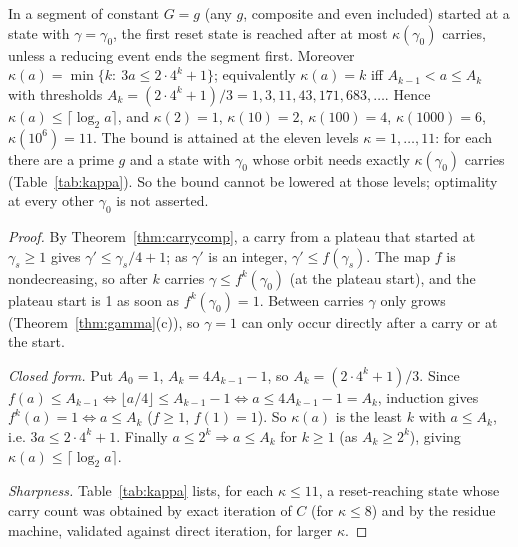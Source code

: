 \begin{theorem}\label{thm:kappa}
In a segment of constant \(G=g\) (any \(g\), composite and even included) started at a state with \(\gamma=\gamma_0\), the first reset state is reached after at most \(\kappa(\gamma_0)\) carries, unless a reducing event ends the segment first. Moreover \(\kappa(a)=\min\{k:\ 3a\le2\cdot4^k+1\}\); equivalently \(\kappa(a)=k\) iff \(A_{k-1}<a\le A_k\) with thresholds \(A_k=(2\cdot4^k+1)/3=1,3,11,43,171,683,\dots\). Hence \(\kappa(a)\le\lceil\log_2a\rceil\), and \(\kappa(2)=1\), \(\kappa(10)=2\), \(\kappa(100)=4\), \(\kappa(1000)=6\), \(\kappa(10^6)=11\). The bound is attained at the eleven levels \(\kappa=1,\dots,11\): for each there are a prime \(g\) and a state with \(\gamma_0\) whose orbit needs exactly \(\kappa(\gamma_0)\) carries (Table~\ref{tab:kappa}). So the bound cannot be lowered at those levels; optimality at every other \(\gamma_0\) is not asserted.
\end{theorem}
\begin{proof}
By Theorem~\ref{thm:carrycomp}, a carry from a plateau that started at \(\gamma_s\ge1\) gives \(\gamma'\le\gamma_s/4+1\); as \(\gamma'\) is an integer, \(\gamma'\le f(\gamma_s)\). The map \(f\) is nondecreasing, so after \(k\) carries \(\gamma\le f^k(\gamma_0)\) (at the plateau start), and the plateau start is 1 as soon as \(f^k(\gamma_0)=1\). Between carries \(\gamma\) only grows (Theorem~\ref{thm:gamma}(c)), so \(\gamma=1\) can only occur directly after a carry or at the start.

\emph{Closed form.} Put \(A_0=1\), \(A_k=4A_{k-1}-1\), so \(A_k=(2\cdot4^k+1)/3\). Since \(f(a)\le A_{k-1}\iff\lfloor a/4\rfloor\le A_{k-1}-1\iff a\le4A_{k-1}-1=A_k\), induction gives \(f^k(a)=1\iff a\le A_k\) (\(f\ge1\), \(f(1)=1\)). So \(\kappa(a)\) is the least \(k\) with \(a\le A_k\), i.e. \(3a\le2\cdot4^k+1\). Finally \(a\le2^k\Rightarrow a\le A_k\) for \(k\ge1\) (as \(A_k\ge2^k\)), giving \(\kappa(a)\le\lceil\log_2a\rceil\).

\emph{Sharpness.} Table~\ref{tab:kappa} lists, for each \(\kappa\le11\), a reset-reaching state whose carry count was obtained by exact iteration of \(C\) (for \(\kappa\le8\)) and by the residue machine, validated against direct iteration, for larger \(\kappa\).
\end{proof}

